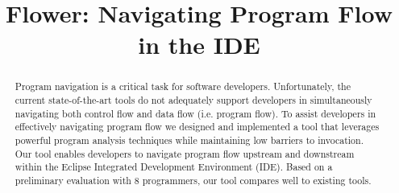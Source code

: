 \documentclass[conference]{IEEEtran}
\newcommand{\toolName}{Flower}
\begin{document}
%
\title{\toolName: Navigating Program Flow in the IDE}


\author{
}

\maketitle

\begin{abstract}
Program navigation is a critical task for software developers. 
Unfortunately, the current state-of-the-art tools do not adequately support developers in simultaneously navigating both control flow and data flow (i.e. program flow). 
To assist developers in effectively navigating program flow we designed and implemented a tool that leverages powerful program analysis techniques while maintaining low barriers to invocation.
Our tool enables developers to navigate program flow upstream and downstream within the Eclipse Integrated Development Environment (IDE).
Based on a preliminary evaluation with 8 programmers, our tool compares well to existing tools. 
\end{abstract}

\end{document}
